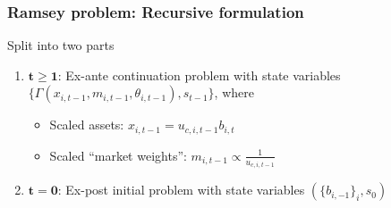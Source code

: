 \documentclass{beamer}
\begin{document}
\begin{frame}

\frametitle{Ramsey problem: Recursive formulation}

Split  into two parts

\begin{enumerate}
\vspace{3mm}
\item $\mathbf{t\geq1}$: Ex-ante continuation problem with state variables $\{\Gamma(x_{i,t-1},m_{i,t-1},\theta_{i,t-1}),s_{t-1}\}$, where

\begin{itemize}
 \item Scaled assets: $x_{i,t-1}=u_{c,i,t-1}b_{i,t}$
 \item Scaled ``market weights'': $m_{i,t-1}\propto \frac{1}{u_{c,i,t-1}}$
\end{itemize}

% 
\vspace{3mm}
\item $\mathbf{t=0} $: Ex-post initial problem with state variables $(\{b_{i,-1}\}_i,s_{0})$
\end{enumerate}

\end{frame}
\end{document}
